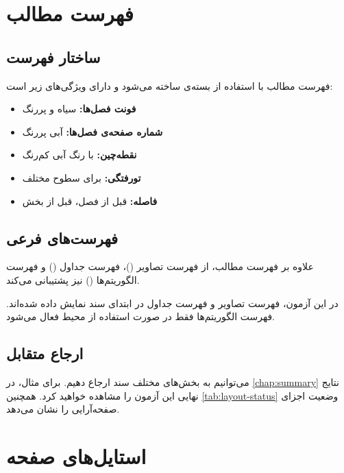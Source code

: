 \documentclass{matinbook}
\begin{document}
\chapter{فهرست مطالب}
\label{chap:toc}

\section{ساختار فهرست}
\label{sec:toc-structure}

فهرست مطالب  با استفاده از بسته‌ی 
ساخته می‌شود و دارای ویژگی‌های زیر است:

\begin{itemize}
    \item \textbf{فونت فصل‌ها:} سیاه و پررنگ
    \item \textbf{شماره صفحه‌ی فصل‌ها:} آبی پررنگ
    \item \textbf{نقطه‌چین:} با رنگ آبی کم‌رنگ
    \item \textbf{تورفتگی:} برای سطوح مختلف
    \item \textbf{فاصله:} \pnum{۸pt} قبل از فصل، \pnum{۴pt} قبل از بخش
\end{itemize}

\section{فهرست‌های فرعی}
\label{sec:toc-sublists}

علاوه بر فهرست مطالب،  از فهرست تصاویر
()، فهرست جداول
() و فهرست الگوریتم‌ها
() نیز پشتیبانی می‌کند.

در این آزمون، فهرست تصاویر و فهرست جداول در ابتدای سند
نمایش داده شده‌اند. فهرست الگوریتم‌ها فقط در صورت استفاده
از محیط  فعال می‌شود.

\section{ارجاع متقابل}
\label{sec:toc-cref}

می‌توانیم به بخش‌های مختلف سند ارجاع دهیم. برای مثال،
در \cref{chap:summary} نتایج نهایی این آزمون را مشاهده
خواهید کرد. همچنین \cref{tab:layout-status} وضعیت
اجزای صفحه‌آرایی را نشان می‌دهد.

\chapter{استایل‌های صفحه}
\label{chap:pagestyles}
\end{document}
